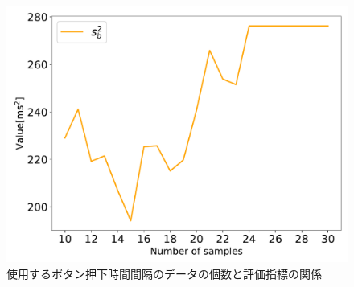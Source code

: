 \begin{figure}[tbp]
  \centering
  \includegraphics[scale=0.6]{figures/Yobi/Var/NumberOfSamples_varSb.pdf}
  \caption{使用するボタン押下時間間隔のデータの個数と評価指標の関係}
  \label{fig:Numberofsamples_Sb}
\end{figure}

